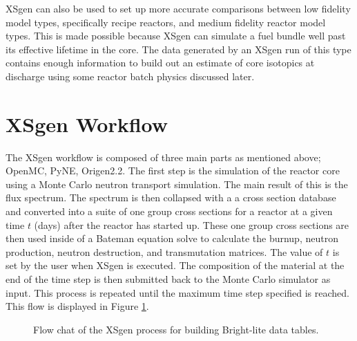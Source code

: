 \documentclass{article}
\begin{document}
XSgen can also be used to set up more accurate comparisons between low fidelity model types, specifically recipe reactors, and medium fidelity reactor model types. This is made possible because XSgen can simulate a fuel bundle well past its effective lifetime in the core. The data generated by an XSgen run of this type contains enough information to build out an estimate of core isotopics at discharge using some reactor batch physics discussed later.

\section{XSgen Workflow}
The XSgen workflow is composed of three main parts as mentioned above; OpenMC, PyNE, Origen2.2. The first step is the simulation of the reactor core using a Monte Carlo neutron transport simulation. The main result of this is the flux spectrum. The spectrum is then collapsed with a a cross section database and converted into a suite of one group cross sections for a reactor at a given time $t$ (days) after the reactor has started up. These one group cross sections are then used inside of
a Bateman equation solve to calculate the burnup, neutron production, neutron destruction,
and transmutation matrices. The value of $t$ is set by the user when XSgen is executed.
The composition of the material at the end of the time step is then submitted back to
the Monte Carlo simulator as input. This process is repeated until the maximum time
step specified is reached. This flow is displayed in Figure \ref{fig:flow}.

\begin{figure}\center{}
\caption{Flow chat of the XSgen process for building Bright-lite data tables.}
\label{fig:flow}
\end{figure}
\end{document}
